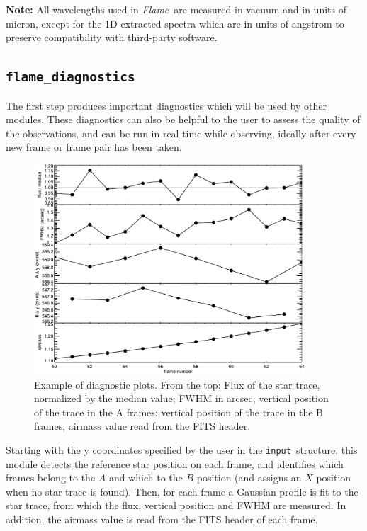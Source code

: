 \documentclass[a4paper]{article}
\newcommand{\flame}{\emph{Flame}}
\newcommand{\inp}{\texttt{input}}
\begin{document}
\begin{sloppypar}
\medskip
\noindent
\textbf{Note:} All wavelengths used in \flame\ are measured in vacuum and in units of micron, except for the 1D extracted spectra which are in units of angstrom to preserve compatibility with third-party software.




\subsection{\texttt{flame\_diagnostics}}
\label{sec:diagnostics}

The first step produces important diagnostics which will be used by other modules. These diagnostics can also be helpful to the user to assess the quality of the observations, and can be run in real time while observing, ideally after every new frame or frame pair has been taken.

\begin{figure}[htbp]
\centering
\includegraphics[width=0.9\textwidth]{diagnostics}
\caption{Example of diagnostic plots. From the top: Flux of the star trace, normalized by the median value; FWHM in arcsec; vertical position of the trace in the A frames; vertical position of the trace in the B frames; airmass value read from the FITS header.}
\label{fig:diagnostics}
\end{figure}

Starting with the y coordinates specified by the user in the \inp\ structure, this module detects the reference star position on each frame, and identifies which frames belong to the $A$ and which to the $B$ position (and assigns an $X$ position when no star trace is found). Then, for each frame a Gaussian profile is fit to the star trace, from which the flux, vertical position and FWHM are measured. In addition, the airmass value is read from the FITS header of each frame.


\end{sloppypar}
\end{document}
